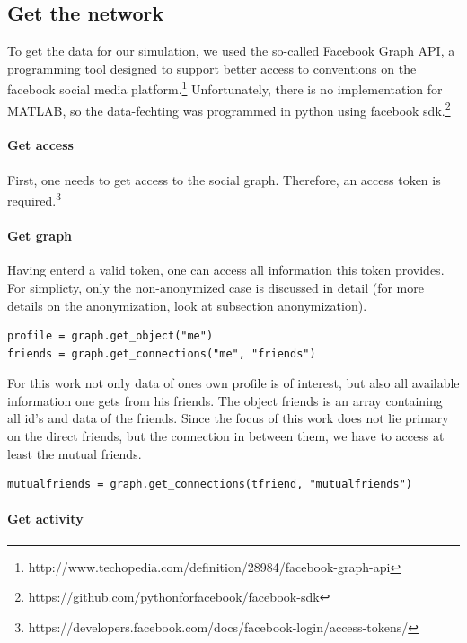
\subsection{Get the network} 

To get the data for our simulation, we used the so-called Facebook Graph API, a programming tool designed to support better access to conventions on the facebook social media platform.\footnote{http://www.techopedia.com/definition/28984/facebook-graph-api} Unfortunately, there is no implementation for MATLAB, so the data-fechting was programmed in python using facebook sdk.\footnote{https://github.com/pythonforfacebook/facebook-sdk} 

\paragraph{Get access}

First, one needs to get access to the social graph. Therefore, an access token is required.\footnote{https://developers.facebook.com/docs/facebook-login/access-tokens/}



\paragraph{Get graph}

Having enterd a valid token, one can access all information this token provides.  For simplicty, only the non-anonymized case is discussed in detail (for more details on the anonymization, look at subsection anonymization).

\begin{lstlisting} 
profile = graph.get_object("me")
friends = graph.get_connections("me", "friends")
\end{lstlisting}
\vspace{4mm}

\noindent For this work not only data of ones own profile is of interest, but also all available information one gets from his friends.
The object friends is an array containing all id's and data of the friends. Since the focus of this work does not lie primary on the direct friends, but the connection in between them, we have to access at least the mutual friends. 

\begin{lstlisting}
mutualfriends = graph.get_connections(tfriend, "mutualfriends")
\end{lstlisting}

\paragraph{Get activity}

